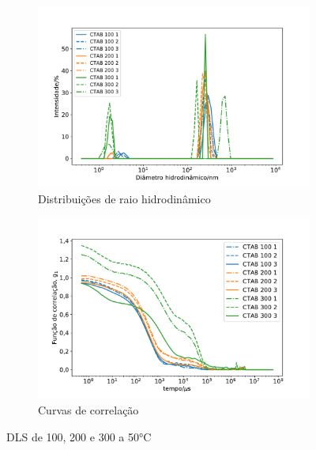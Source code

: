\begin{figure}[h]
	\begin{subfigure}{0.47\textwidth}
		\centering
		\includegraphics[width=\textwidth]{imagens/dls/ctab_distrib}
		\caption{Distribuições de raio hidrodinâmico}
		\label{fig:DLS_ctab_distrib}
	\end{subfigure} \qquad %
	\begin{subfigure}{0.47\textwidth}
		\centering
		\includegraphics[width=\textwidth]{imagens/dls/ctab_CC}
		\caption{Curvas de correlação}
		\label{fig:DLS_ctab_cc}
	\end{subfigure}
	\caption{DLS de \CTAB{} 100, 200 e 300 \mM{} a 50°C}
	\label{fig:DLS_ctab}
\end{figure}

